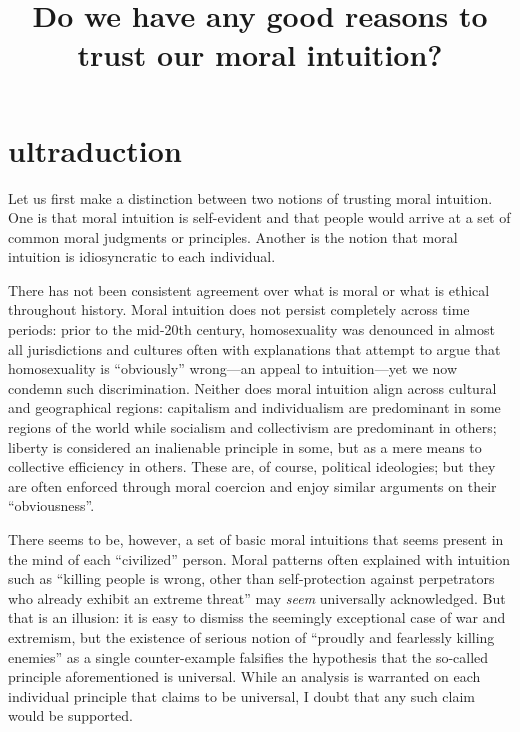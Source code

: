 \documentclass{scrartcl}
\title{Do we have any good reasons to trust our moral intuition?}
\author{}
\date{}
\begin{document}
\maketitle


\section{ultraduction}

Let us first make a distinction between two notions of trusting moral intuition. One is that moral intuition is self-evident and that people would arrive at a set of common moral judgments or principles. Another is the notion that moral intuition is idiosyncratic to each individual.

There has not been consistent agreement over what is moral or what is ethical throughout history. Moral intuition does not persist completely across time periods: prior to the mid-20th century, homosexuality was denounced in almost all jurisdictions and cultures often with explanations that attempt to argue that homosexuality is ``obviously'' wrong---an appeal to intuition---yet we now condemn such discrimination. Neither does moral intuition align across cultural and geographical regions: capitalism and individualism are predominant in some regions of the world while socialism and collectivism are predominant in others; liberty is considered an inalienable principle in some, but as a mere means to collective efficiency in others. These are, of course, political ideologies; but they are often enforced through moral coercion and enjoy similar arguments on their ``obviousness''.

There seems to be, however, a set of basic moral intuitions that seems present in the mind of each ``civilized'' person. Moral patterns often explained with intuition such as ``killing people is wrong, other than self-protection against perpetrators who already exhibit an extreme threat'' may \emph{seem} universally acknowledged. But that is an illusion: it is easy to dismiss the seemingly exceptional case of war and extremism, but the existence of serious notion of ``proudly and fearlessly killing enemies'' as a single counter-example falsifies the hypothesis that the so-called principle aforementioned is universal. While an analysis is warranted on each individual principle that claims to be universal, I doubt that any such claim would be supported.%
\end{document}
